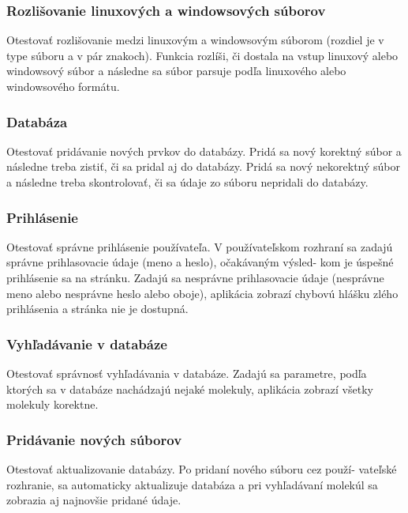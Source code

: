 \documentclass[12pt,a4paper]{article}
\begin{document}
\subsubsection{Rozlišovanie linuxových a windowsových súborov}
Otestovať rozlišovanie medzi linuxovým a windowsovým súborom (rozdiel je v type súboru a v pár znakoch). Funkcia rozlíši, či dostala na vstup linuxový alebo windowsový súbor a následne sa súbor parsuje podľa linuxového alebo windowsového formátu.  

\subsubsection{Databáza}
Otestovať pridávanie nových prvkov do databázy. Pridá sa nový korektný súbor a následne treba zistiť, či sa pridal aj do databázy. Pridá sa nový nekorektný súbor a následne treba skontrolovať, či sa údaje zo súboru nepridali do databázy.

\subsubsection{Prihlásenie}
Otestovať správne prihlásenie používateľa. V používateľskom rozhraní
sa zadajú správne prihlasovacie údaje (meno a heslo), očakávaným výsled-
kom je úspešné prihlásenie sa na stránku. Zadajú sa nesprávne prihlasovacie
údaje (nesprávne meno alebo nesprávne heslo alebo oboje), aplikácia zobrazí
chybovú hlášku zlého prihlásenia a stránka nie je dostupná.

\subsubsection{Vyhľadávanie v databáze}
Otestovať správnosť vyhľadávania v databáze. Zadajú sa parametre,
podľa ktorých sa v databáze nachádzajú nejaké molekuly, aplikácia zobrazí
všetky molekuly korektne.

\subsubsection{Pridávanie nových súborov}
Otestovať aktualizovanie databázy. Po pridaní nového súboru cez použí-
vateľské rozhranie, sa automaticky aktualizuje databáza a pri vyhľadávaní
molekúl sa zobrazia aj najnovšie pridané údaje.
\end{document}
